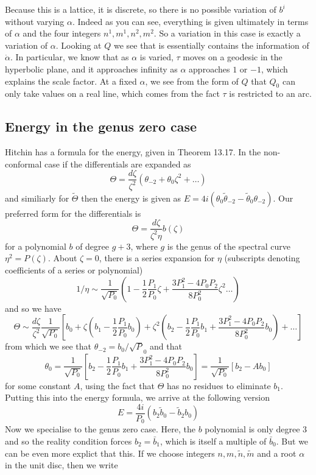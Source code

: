 Because this is a lattice, it is discrete, so there is no possible variation of $b^i$ without varying $\alpha$. Indeed as you can see, everything is given ultimately in terms of $\alpha$ and the four integers $n^1,m^1,n^2,m^2$. So a variation in this case is exactly a variation of $\alpha$. Looking at $Q$ we see that is essentially contains the information of $\dot\alpha$. In particular, we know that as $\alpha$ is varied, $\tau$ moves on a geodesic in the hyperbolic plane, and it approaches infinity as $\alpha$ approaches $1$ or $-1$, which explains the scale factor. At a fixed $\alpha$, we see from the form of $Q$ that $Q_0$ can only take values on a real line, which comes from the fact $\tau$ is restricted to an arc.

\subsection{Energy in the genus zero case}
Hitchin has a formula for the energy, given in Theorem 13.17. In the non-conformal case if the differentials are expanded as
\[
\Theta = \frac{d\zeta}{\zeta^2}(\theta_{-2} + \theta_0\zeta^2 + \dots)
\]
and similiarly for $\tilde \Theta$ then the energy is given as $E = 4i(\theta_0 \tilde \theta_{-2} - \tilde \theta_0 \theta_{-2})$. Our preferred form for the differentials is
\[
  \Theta = \frac{d\zeta}{\zeta^2\eta}b(\zeta)
\]
for a polynomial $b$ of degree $g+3$, where $g$ is the genus of the spectral curve $\eta^2 = P(\zeta)$. About $\zeta=0$, there is a series expansion for $\eta$ (subscripts denoting coefficients of a series or polynomial)
\[
  1/\eta \sim \frac{1}{\sqrt{P_0}}\left(1 - \frac{1}{2}\frac{P_1}{P_0}\zeta + \frac{3P_1^2 - 4P_0P_2}{8P_0^2}\zeta^2\dots\right)
\]
and so we have
\[
  \Theta \sim \frac{d\zeta}{\zeta^2}\frac{1}{\sqrt{P_0}}\left[ b_0 + \zeta\left( b_1 - \frac{1}{2}\frac{P_1}{P_0}b_0 \right) + \zeta^2\left( b_2 - \frac{1}{2}\frac{P_1}{P_0}b_1 + \frac{3P_1^2 - 4P_0P_2}{8P_0^2}b_0 \right) + \dots\right]
\]
from which we see that $\theta_{-2} = b_0 / \sqrt P_0$ and that
\[
  \theta_0 = \frac{1}{\sqrt{P_0}}\left[b_2 - \frac{1}{2}\frac{P_1}{P_0}b_1 + \frac{3P_1^2 - 4P_0P_2}{8P_0^2}b_0\right] = \frac{1}{\sqrt{P_0}}\left[b_2 - A b_0\right]
\]
for some constant $A$, using the fact that $\Theta$ has no residues to eliminate $b_1$. Putting this into the energy formula, we arrive at the following version
\[
  E = \frac{4i}{P_0} (b_2 \tilde b_0 - \tilde b_2 b_0)
\]
Now we specialise to the genus zero case. Here, the $b$ polynomial is only degree $3$ and so the reality condition forces $b_2 = \bar b_1$, which is itself a multiple of $\bar b_0$. But we can be even more explict that this. If we choose integers $n,m,\tilde n, \tilde m$ and a root $\alpha$ in the unit disc, then we write
